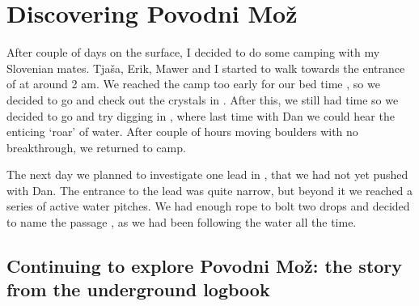 



\section{Discovering Povodni Mož}


After couple of days on the surface, I decided to do some camping with
my Slovenian mates. Tjaša, Erik, Mawer and I started to walk towards the
entrance of  at around 2 am. We reached the camp too
early for our bed time
, so we
decided to go and check out the crystals in .
After this, we still had time so we decided to go and try digging in
, where last time with Dan we could hear the
enticing `roar' of water. After couple of hours moving boulders with no
breakthrough, we returned to camp.


The next day we planned to investigate one lead in , that we had not yet pushed with Dan. The entrance to the lead
was quite narrow, but beyond it we reached a series of active water
pitches. We had enough rope to bolt two drops and decided to name the
passage  , as we had been
following the water all the time.


\subsection{Continuing to explore Povodni Mož: the story from the underground logbook}

